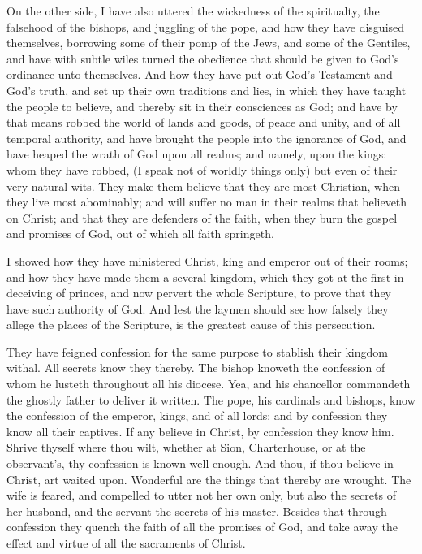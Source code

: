 On the other side, I have also uttered the wickedness 
of the spiritualty, the falsehood of the bishops, and 
juggling of the pope, and how they have disguised themselves,
borrowing some of their pomp of the Jews, and 
some of the Gentiles, and have with subtle wiles turned 
the obedience that should be given to God's ordinance unto 
themselves. And how they have put out God's Testament 
and God's truth, and set up their own traditions and lies, 
in which they have taught the people to believe, and thereby 
sit in their consciences as God; and have by that means 
robbed the world of lands and goods, of peace and unity, 
and of all temporal authority, and have brought the people 
into the ignorance of God, and have heaped the wrath of 
God upon all realms; and namely, upon the kings: 
whom they have robbed, (I speak not of worldly things 
only) but even of their very natural wits. They make 
them believe that they are most Christian, when they live 
most abominably; and will suffer no man in their realms 
that believeth on Christ; and that they are defenders of 
the faith, when they burn the gospel and promises of God, 
out of which all faith springeth. 

I showed how they have ministered Christ, king and 
emperor out of their rooms; and how they have made 
them a several kingdom, which they got at the first in 
deceiving of princes, and now pervert the whole Scripture,
to prove that they have such authority of God. 
And lest the laymen should see how falsely they allege 
the places of the Scripture, is the greatest cause of this 
persecution. 

They have feigned confession for the same purpose to 
stablish their kingdom withal. All secrets know they 
thereby. The bishop knoweth the confession of whom 
he lusteth throughout all his diocese. Yea, and his chancellor
commandeth the ghostly father to deliver it written. 
The pope, his cardinals and bishops, know the confession 
of the emperor, kings, and of all lords: and by confession
they know all their captives. If any believe in Christ, 
by confession they know him. Shrive thyself where thou 
wilt, whether at Sion, Charterhouse, or at the observant's, 
thy confession is known well enough. And thou, if thou 
believe in Christ, art waited upon. Wonderful are the 
things that thereby are wrought. The wife is feared, and 
compelled to utter not her own only, but also the secrets 
of her husband, and the servant the secrets of his master. 
Besides that through confession they quench the faith of 
all the promises of God, and take away the effect and 
virtue of all the sacraments of Christ. 

